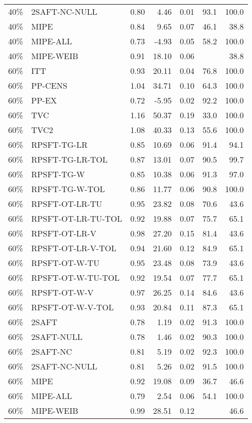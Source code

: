 \begin{table}[ht]
{\begin{tabular}{llrrrrr}
  40\% & 2SAFT-NC-NULL & 0.80 & 4.46 & 0.01 & 93.1 & 100.0 \\ 
  40\% & MIPE & 0.84 & 9.65 & 0.07 & 46.1 & 38.8 \\ 
  40\% & MIPE-ALL & 0.73 & -4.93 & 0.05 & 58.2 & 100.0 \\ 
  40\% & MIPE-WEIB & 0.91 & 18.10 & 0.06 &  & 38.8 \\ 
   \hline
60\% & ITT & 0.93 & 20.11 & 0.04 & 76.8 & 100.0 \\ 
  60\% & PP-CENS & 1.04 & 34.71 & 0.10 & 64.3 & 100.0 \\ 
  60\% & PP-EX & 0.72 & -5.95 & 0.02 & 92.2 & 100.0 \\ 
  60\% & TVC & 1.16 & 50.37 & 0.19 & 33.0 & 100.0 \\ 
  60\% & TVC2 & 1.08 & 40.33 & 0.13 & 55.6 & 100.0 \\ 
   \hline
60\% & RPSFT-TG-LR & 0.85 & 10.69 & 0.06 & 91.4 & 94.1 \\ 
  60\% & RPSFT-TG-LR-TOL & 0.87 & 13.01 & 0.07 & 90.5 & 99.7 \\ 
  60\% & RPSFT-TG-W & 0.85 & 10.38 & 0.06 & 91.3 & 97.0 \\ 
  60\% & RPSFT-TG-W-TOL & 0.86 & 11.77 & 0.06 & 90.8 & 100.0 \\ 
  60\% & RPSFT-OT-LR-TU & 0.95 & 23.82 & 0.08 & 70.6 & 43.6 \\ 
  60\% & RPSFT-OT-LR-TU-TOL & 0.92 & 19.88 & 0.07 & 75.7 & 65.1 \\ 
  60\% & RPSFT-OT-LR-V & 0.98 & 27.20 & 0.15 & 81.4 & 43.6 \\ 
  60\% & RPSFT-OT-LR-V-TOL & 0.94 & 21.60 & 0.12 & 84.9 & 65.1 \\ 
   \hline
60\% & RPSFT-OT-W-TU & 0.95 & 23.48 & 0.08 & 73.9 & 43.6 \\ 
  60\% & RPSFT-OT-W-TU-TOL & 0.92 & 19.54 & 0.07 & 77.7 & 65.1 \\ 
  60\% & RPSFT-OT-W-V & 0.97 & 26.25 & 0.14 & 84.6 & 43.6 \\ 
  60\% & RPSFT-OT-W-V-TOL & 0.93 & 20.84 & 0.11 & 87.3 & 65.1 \\ 
   \hline
60\% & 2SAFT & 0.78 & 1.19 & 0.02 & 91.3 & 100.0 \\ 
  60\% & 2SAFT-NULL & 0.78 & 1.46 & 0.02 & 90.3 & 100.0 \\ 
  60\% & 2SAFT-NC & 0.81 & 5.19 & 0.02 & 92.3 & 100.0 \\ 
  60\% & 2SAFT-NC-NULL & 0.81 & 5.26 & 0.02 & 91.5 & 100.0 \\ 
  60\% & MIPE & 0.92 & 19.08 & 0.09 & 36.7 & 46.6 \\ 
  60\% & MIPE-ALL & 0.79 & 2.54 & 0.06 & 54.1 & 100.0 \\ 
  60\% & MIPE-WEIB & 0.99 & 28.51 & 0.12 &  & 46.6 \\ 
   \hline
\end{tabular}
}
\end{table}

